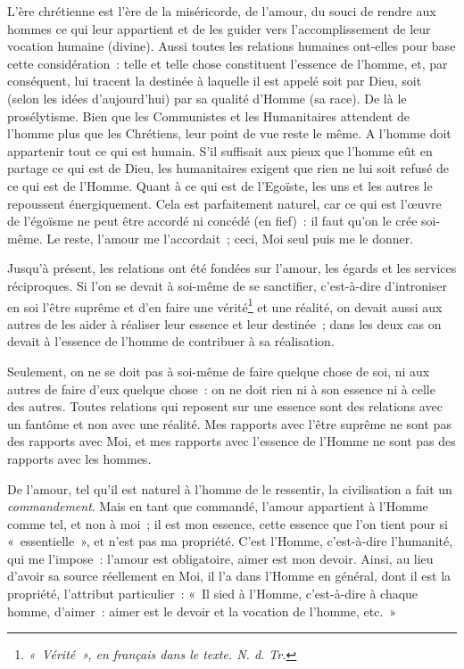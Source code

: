 \documentclass[french,twoside]{book} %
\begin{document}
L’ère chrétienne est l’ère de la miséricorde, de l’amour, du souci de rendre aux hommes ce qui leur appartient et de les guider vers l’accomplissement de leur vocation humaine (divine). Aussi toutes les relations humaines ont-elles pour base cette considération : telle et telle chose constituent l’essence de l’homme, et, par conséquent, lui tracent la destinée à laquelle il est appelé soit par Dieu, soit (selon les idées d’aujourd’hui) par sa qualité d’Homme (sa race). De là le prosélytisme. Bien que les Communistes et les Humanitaires attendent de l’homme plus que les Chrétiens, leur point de vue reste le même. A l’homme doit appartenir tout ce qui est humain. S’il suffisait aux pieux que l’homme eût en partage ce qui est de Dieu, les humanitaires exigent que rien ne lui soit refusé de ce qui est de l’Homme. Quant à ce qui est de l’Egoïste, les uns et les autres le repoussent énergiquement. Cela est parfaitement naturel, car ce qui est l’œuvre de l’égoïsme ne peut être accordé ni concédé (en fief) : il faut qu’on le crée soi-même. Le reste, l’amour me l’accordait ; ceci, Moi seul puis me le donner.\par
Jusqu’à présent, les relations ont été fondées sur l’amour, les égards et les services réciproques. Si l’on se devait à soi-même de se sanctifier, c’est-à-dire d’introniser en soi l’être suprême et d’en faire une vérité\footnote{ \noindent \emph{« Vérité », en français dans le texte. N. d. Tr.}
 } et une réalité, on devait aussi aux autres de les aider à réaliser leur essence et leur destinée ; dans les deux cas on devait à l’essence de l’homme de contribuer à sa réalisation.\par
 Seulement, on ne se doit pas à soi-même de faire quelque chose de soi, ni aux autres de faire d’eux quelque chose : on ne doit rien ni à son essence ni à celle des autres. Toutes relations qui reposent sur une essence sont des relations avec un fantôme et non avec une réalité. Mes rapports avec l’être suprême ne sont pas des rapports avec Moi, et mes rapports avec l’essence de l’Homme ne sont pas des rapports avec les hommes.\par
De l’amour, tel qu’il est naturel à l’homme de le ressentir, la civilisation a fait un \emph{commandement}. Mais en tant que commandé, l’amour appartient à l’Homme comme tel, et non à moi ; il est mon essence, cette essence que l’on tient pour si « essentielle », et n’est pas ma propriété. C’est l’Homme, c’est-à-dire l’humanité, qui me l’impose : l’amour est obligatoire, aimer est mon devoir. Ainsi, au lieu d’avoir sa source réellement en Moi, il l’a dans l’Homme en général, dont il est la propriété, l’attribut particulier : « Il sied à l’Homme, c’est-à-dire à chaque homme, d’aimer : aimer est le devoir et la vocation de l’homme, etc. »\par
\end{document}
